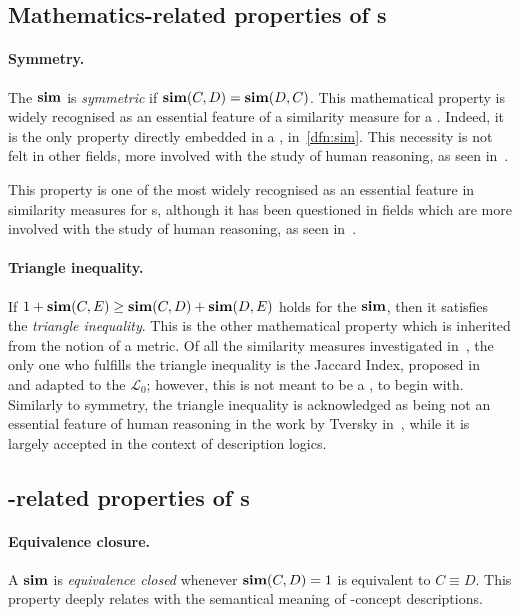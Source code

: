 \subsection{Mathematics-related properties of \csm{}s}

\paragraph{Symmetry.}
The \csm \(\operatorname{\mathbf{sim}}\) is \emph{symmetric} if \(\operatorname{\mathbf{sim}}(C,D) = \operatorname{\mathbf{sim}}(D,C)\).
This mathematical property is widely recognised as an essential feature of a similarity measure for a \dl.
Indeed, it is the only property directly embedded in a \csm, in~\cref{dfn:sim}.
This necessity is not felt in other fields, more involved with the study of human reasoning, as seen in~\cite{Tve77}.

This property is one of the most widely recognised as an essential feature in similarity measures for \dl{}s, although it has been questioned in fields which are more involved with the study of human reasoning, as seen in~\cite{Tve77}.

\paragraph{Triangle inequality.}
If \(1 + \operatorname{\mathbf{sim}}(C,E) \ge \operatorname{\mathbf{sim}}(C,D) + \operatorname{\mathbf{sim}}(D,E)\) holds for the \csm \(\operatorname{\mathbf{sim}}\), then it satisfies the \emph{triangle inequality}.
This is the other mathematical property which is inherited from the notion of a metric.
Of all the similarity measures investigated in~\cite{LeTu12}, the only one who fulfills the triangle inequality is the Jaccard Index, proposed in~\cite{Ja01} and adapted to the \dl \(\mathcal{L}_0\); however, this is not meant to be a \csm, to begin with.
Similarly to symmetry, the triangle inequality is  acknowledged as being not an essential feature of human reasoning in the work by Tversky in~\cite{Tve77}, while it is largely accepted in the context of description logics.

\subsection{\dl-related properties of \csm{}s}

\paragraph{Equivalence closure.}
A \csm \(\operatorname{\mathbf{sim}}\) is \emph{equivalence closed} whenever \(\operatorname{\mathbf{sim}}(C,D) = 1\) is equivalent to \(C \equiv D\).
This property deeply relates with the semantical meaning of \elh-concept descriptions.

